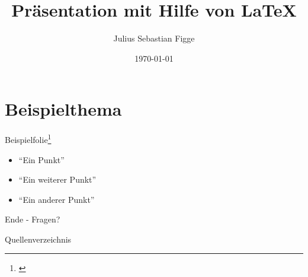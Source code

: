 \documentclass[xcolor=dvipsnames,11pt]{beamer}
\author{Julius Sebastian Figge}
\title[FHDW Präsentation Template]{Präsentation mit Hilfe von \LaTeX}
\date{\today}
\begin{document}
\begin{frame}
\titlepage
\end{frame}

\frame{\tableofcontents}

\section{Beispielthema}

\begin{frame}{Beispielfolie\footnote{\cite{ExampleEntry}}}
\begin{itemize}
	\item \enquote{Ein Punkt} 
	\item \enquote{Ein weiterer Punkt} 
	\item \enquote{Ein anderer Punkt} 
\end{itemize}
\end{frame}

\begin{frame}
\center \huge Ende - Fragen?
\end{frame}

\begin{frame}[allowframebreaks]{Quellenverzeichnis}
\tiny\printbibliography
\end{frame}
\end{document}
